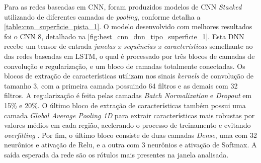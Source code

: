 Para as redes baseadas em CNN, foram produzidos modelos de CNN \textit{Stacked} utilizando de diferentes camadas de \textit{pooling}, conforme detalha a \autoref{table:cnn_superficie_pista_1}. O modelo desenvolvido com melhores resultados foi o CNN 8, detalhado na \autoref{fig:best_cnn_dnn_tipo_superficie_1}. Esta DNN recebe um tensor de entrada \emph{janelas x sequências x características} semelhante ao das redes baseadas em LSTM, o qual é processado por três blocos de camadas de convolução e regularização, e um bloco de camadas totalmente conectadas. Os blocos de extração de características utilizam nos sinais \textit{kernels} de convolução de tamanho 3, com a primeira camada possuindo 64 filtros e as demais com 32 filtros. A regularização é feita pelas camadas \textit{Batch Normalization} e \textit{Dropout} em 15\% e 20\%. O último bloco de extração de características também possui uma camada \textit{Global Average Pooling 1D} para extrair características mais robustas por valores médios em cada região, acelerando o processo de treinamento e evitando \textit{overfitting} \cite{Yang2018, Wang2019}. Por fim, o último bloco consiste de duas camadas \textit{Dense}, uma com 32 neurônios e ativação de Relu, e a outra com 3 neurônios e ativação de Softmax. A saída esperada da rede são os rótulos mais presentes na janela analisada.

